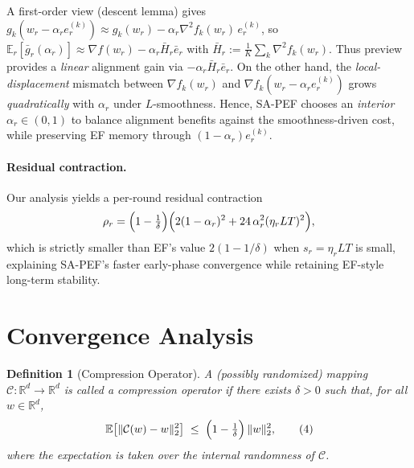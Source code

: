 \documentclass{article} %
\newtheorem{definition}{Definition}
\begin{document}
A first-order view (descent lemma) gives $g_k(w_r-\alpha_r e_r^{(k)}) \approx g_k(w_r) - \alpha_r \nabla^2 f_k(w_r)\,e_r^{(k)}$, so $\mathbb{E}_r[\bar g_r(\alpha_r)] \approx \nabla f(w_r) - \alpha_r \bar H_r \bar e_r$ with $\bar H_r := \tfrac1K\sum_k \nabla^2 f_k(w_r)$. Thus preview provides a \emph{linear} alignment gain via $-\alpha_r \bar H_r \bar e_r$. On the other hand, the \emph{local-displacement} mismatch between $\nabla f_k(w_r)$ and $\nabla f_k(w_r-\alpha_r e_r^{(k)})$ grows \emph{quadratically} with $\alpha_r$ under $L$-smoothness. Hence, SA-PEF chooses an \emph{interior} $\alpha_r\in(0,1)$ to balance alignment benefits against the smoothness-driven cost, while preserving EF memory through $(1-\alpha_r)e_r^{(k)}$.

\paragraph{Residual contraction.} 
Our analysis yields a per-round residual contraction
\[
\rho_r=\Bigl(1-\tfrac{1}{\delta}\Bigr)\Bigl(2(1-\alpha_r)^2+24\,\alpha_r^2(\eta_r L T)^2\Bigr),
\]
which is strictly smaller than EF’s value $2(1-1/\delta)$ when $s_r=\eta_rLT$ is small, explaining SA-PEF’s faster early-phase convergence while retaining EF-style long-term stability.



\section{Convergence Analysis}

\begin{definition}[Compression Operator]
\label{def:compression-operator}
A (possibly randomized) mapping $\mathcal{C}: \mathbb{R}^d \to \mathbb{R}^d$ is called a compression operator if there exists $\delta > 0$ such that, for all $w \in \mathbb{R}^d$,
\begin{equation}
\label{eq4}
\mathbb{E}\bigl[\|\mathcal{C}(w) - w\|_2^2\bigr]
\;\le\;
\Bigl(1 - \tfrac{1}{\delta}\Bigr)\,\|w\|_2^2,   \tag{4}
\end{equation}
where the expectation is taken over the internal randomness of $\mathcal{C}$.
\end{definition}
\end{document}
